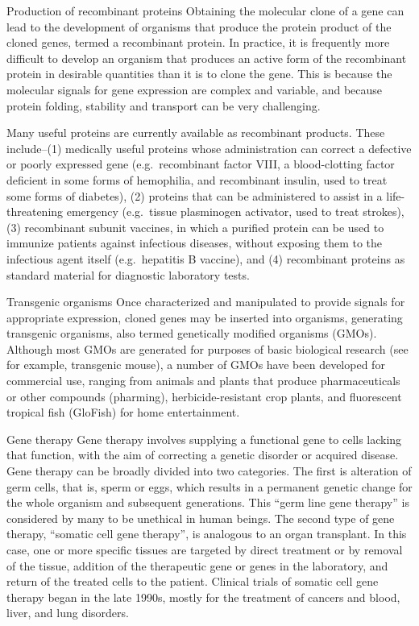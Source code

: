 Production of recombinant proteins
Obtaining the molecular clone of a gene can lead to the development of organisms that produce the protein product of the cloned genes, termed a recombinant protein. In practice, it is frequently more difficult to develop an organism that produces an active form of the recombinant protein in desirable quantities than it is to clone the gene. This is because the molecular signals for gene expression are complex and variable, and because protein folding, stability and transport can be very challenging.

Many useful proteins are currently available as recombinant products. These include--(1) medically useful proteins whose administration can correct a defective or poorly expressed gene (e.g.~recombinant factor VIII, a blood-clotting factor deficient in some forms of hemophilia, and recombinant insulin, used to treat some forms of diabetes), (2) proteins that can be administered to assist in a life-threatening emergency (e.g.~tissue plasminogen activator, used to treat strokes), (3) recombinant subunit vaccines, in which a purified protein can be used to immunize patients against infectious diseases, without exposing them to the infectious agent itself (e.g.~hepatitis B vaccine), and (4) recombinant proteins as standard material for diagnostic laboratory tests.

Transgenic organisms
Once characterized and manipulated to provide signals for appropriate expression, cloned genes may be inserted into organisms, generating transgenic organisms, also termed genetically modified organisms (GMOs). Although most GMOs are generated for purposes of basic biological research (see for example, transgenic mouse), a number of GMOs have been developed for commercial use, ranging from animals and plants that produce pharmaceuticals or other compounds (pharming), herbicide-resistant crop plants, and fluorescent tropical fish (GloFish) for home entertainment.

Gene therapy
Gene therapy involves supplying a functional gene to cells lacking that function, with the aim of correcting a genetic disorder or acquired disease. Gene therapy can be broadly divided into two categories. The first is alteration of germ cells, that is, sperm or eggs, which results in a permanent genetic change for the whole organism and subsequent generations. This ``germ line gene therapy'' is considered by many to be unethical in human beings. The second type of gene therapy, ``somatic cell gene therapy'', is analogous to an organ transplant. In this case, one or more specific tissues are targeted by direct treatment or by removal of the tissue, addition of the therapeutic gene or genes in the laboratory, and return of the treated cells to the patient. Clinical trials of somatic cell gene therapy began in the late 1990s, mostly for the treatment of cancers and blood, liver, and lung disorders.

